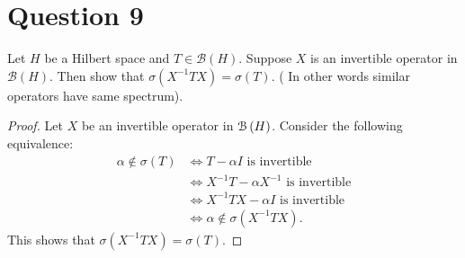 \section{Question 9}

\horz

Let $H$ be a Hilbert space and $T\in \mathcal B(H).$ Suppose $X$ is an invertible operator in $\mathcal B(H).$ Then show that $\sigma (X^{-1}TX) = \sigma (T).$ ( In other words similar operators have same spectrum). 

\horz

\begin{proof}
    Let $X$ be an invertible operator in ${\cal B} \left( H \right)$. Consider the following equivalence:
    \begin{align*}
	\alpha \not \in \sigma \left( T \right) &\Longleftrightarrow T-\alpha I \text{ is invertible} \\
	&\Longleftrightarrow X^{-1}T - \alpha X^{-1} \text{ is invertible} \\
	&\Longleftrightarrow X^{-1}TX - \alpha I \text{ is invertible} \\
	&\Longleftrightarrow \alpha \not \in \sigma \left( X^{-1}TX \right).
    \end{align*}
    This shows that $\sigma \left( X^{-1}TX \right) = \sigma \left( T \right)$.
\end{proof}
